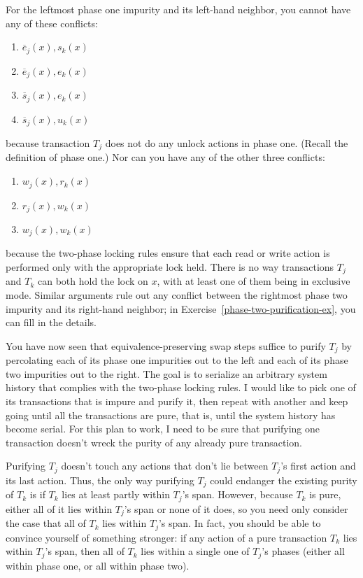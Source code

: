 For the leftmost phase one impurity and its left-hand neighbor, you
cannot have any of these conflicts:
\begin{enumerate}
\item $\overline{e}_j(x), s_k(x)$
\item $\overline{e}_j(x), e_k(x)$
\item $\overline{s}_j(x), e_k(x)$
\item $\overline{s}_j(x), u_k(x)$
\end{enumerate}
because transaction $T_j$ does not do any unlock actions in phase one.
(Recall the definition of phase one.)  Nor can you have any of the
other three conflicts:
\begin{enumerate}[resume]
\item $w_j(x), r_k(x)$
\item $r_j(x), w_k(x)$
\item $w_j(x), w_k(x)$
\end{enumerate}
because the two-phase locking rules ensure that each read or write action is performed only with the
appropriate lock held.  There is no way transactions $T_j$ and $T_k$
can both hold the lock on $x$, with at least one of them being in
exclusive mode.  Similar arguments rule out any conflict between the
rightmost phase two impurity and its right-hand neighbor; in
Exercise~\ref{phase-two-purification-ex}, you can fill in the details.

You have now seen that equivalence-preserving swap steps suffice to
purify $T_j$ by percolating each of its phase one impurities out to
the left and each of its phase two impurities out to the right.  The
goal is to serialize an arbitrary system history that complies with
the two-phase locking rules.  I would like to pick one of its
transactions that is impure and purify it, then repeat with another
and keep going until all the transactions are pure, that is, until the system
history has become serial.  For this plan to work, I need to be sure
that purifying one transaction doesn't wreck the purity of any already
pure transaction.

Purifying $T_j$ doesn't touch any actions that don't lie between
$T_j$'s first action and its last action.  Thus, the only way
purifying $T_j$ could endanger the existing purity of $T_k$ is if
$T_k$ lies at least partly within $T_j$'s span.  However, because $T_k$
is pure, either all of it lies within $T_j$'s span or none of it does,
so you need only consider the case that all of $T_k$ lies within
$T_j$'s span.  In fact, you should be able to convince yourself of
something stronger: if any action of a pure transaction $T_k$ lies within $T_j$'s span,
then all of $T_k$ lies within a single one of $T_j$'s phases (either
all within phase one, or all within phase two).

